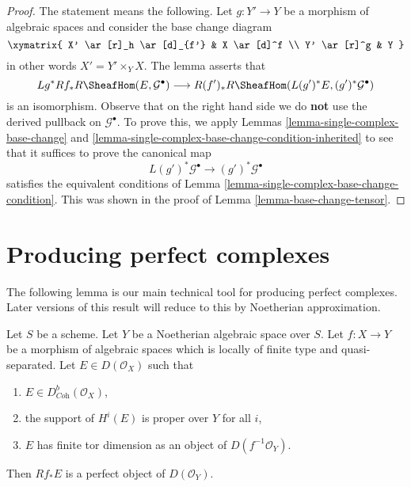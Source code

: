 \begin{proof}
The statement means the following. Let $g : Y' \to Y$ be a morphism of
algebraic spaces and consider the base change diagram
$$
\xymatrix{
X' \ar[r]_h \ar[d]_{f'} &
X \ar[d]^f \\
Y' \ar[r]^g &
Y
}
$$
in other words $X' = Y' \times_Y X$. The lemma asserts that
$$
Lg^*Rf_*R\SheafHom(E, \mathcal{G}^\bullet)
\longrightarrow
R(f')_*R\SheafHom(L(g')^*E, (g')^*\mathcal{G}^\bullet)
$$
is an isomorphism. Observe that on the right hand side we do {\bf not}
use the derived pullback on $\mathcal{G}^\bullet$. To prove this, we apply
Lemmas \ref{lemma-single-complex-base-change} and
\ref{lemma-single-complex-base-change-condition-inherited} to see that it
suffices to prove the canonical map
$$
L(g')^*\mathcal{G}^\bullet \to (g')^*\mathcal{G}^\bullet
$$
satisfies the equivalent conditions of
Lemma \ref{lemma-single-complex-base-change-condition}.
This was shown in the proof of Lemma \ref{lemma-base-change-tensor}.
\end{proof}















\section{Producing perfect complexes}
\label{section-producing-perfect}

\noindent
The following lemma is our main technical tool for producing
perfect complexes. Later versions of this result will reduce to
this by Noetherian approximation.

\begin{lemma}
\label{lemma-perfect-direct-image}
Let $S$ be a scheme. Let $Y$ be a Noetherian algebraic space over $S$.
Let $f : X \to Y$ be a morphism of algebraic spaces which is locally of
finite type and quasi-separated. Let $E \in D(\mathcal{O}_X)$ such that
\begin{enumerate}
\item $E \in D^b_{\textit{Coh}}(\mathcal{O}_X)$,
\item the support of $H^i(E)$ is proper over $Y$ for all $i$,
\item $E$ has finite tor dimension as an object of $D(f^{-1}\mathcal{O}_Y)$.
\end{enumerate}
Then $Rf_*E$ is a perfect object of $D(\mathcal{O}_Y)$.
\end{lemma}

